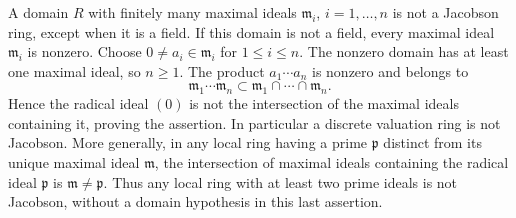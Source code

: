 \begin{example}
\label{example-not-jacobson}
A domain $R$ with finitely many maximal ideals
$\mathfrak m_i$, $i = 1, \ldots, n$ is not a
Jacobson ring, except when it is a field.
If this domain is not a field, every maximal ideal $\mathfrak m_i$
is nonzero. Choose $0\ne a_i\in\mathfrak m_i$ for $1\leq i\leq n$.
The nonzero domain has at least one maximal ideal, so $n\geq1$.
The product $a_1\cdots a_n$ is nonzero and belongs to
$$
\mathfrak m_1\cdots\mathfrak m_n
\subset\mathfrak m_1\cap\cdots\cap\mathfrak m_n.
$$
Hence the radical ideal $(0)$ is not the intersection of the maximal
ideals containing it, proving the assertion. In particular a discrete
valuation ring is not Jacobson. More generally, in any local ring
having a prime $\mathfrak p$ distinct from its unique maximal ideal
$\mathfrak m$, the intersection of maximal ideals containing the
radical ideal $\mathfrak p$ is $\mathfrak m\ne\mathfrak p$.
Thus any local ring with at least two prime ideals is not Jacobson,
without a domain hypothesis in this last assertion.
\end{example}